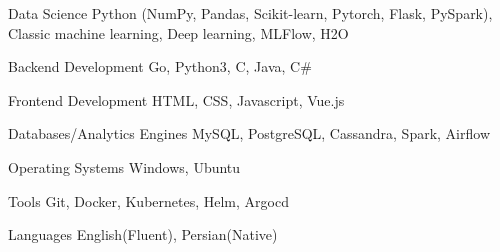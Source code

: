 

\begin{cvskills}

  \cvskill
    {Data Science} %
    {Python (NumPy, Pandas, Scikit-learn, Pytorch, Flask, PySpark), Classic machine learning, Deep learning, MLFlow, H2O} %

  \cvskill
    {Backend Development} %
    {Go, Python3, C, Java, C\#} %

  \cvskill
    {Frontend Development} %
    {HTML, CSS, Javascript, Vue.js} %

  \cvskill
    {Databases/Analytics Engines} %
    {MySQL, PostgreSQL, Cassandra, Spark, Airflow} %

  \cvskill
    {Operating Systems} %
    {Windows, Ubuntu} %

  \cvskill
    {Tools} %
    {Git, Docker, Kubernetes, Helm, Argocd} %

  \cvskill
    {Languages} %
    {English(Fluent), Persian(Native)} %

\end{cvskills}
